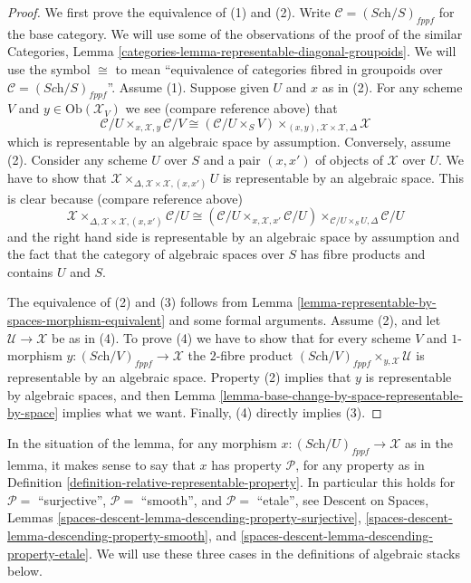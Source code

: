 \begin{proof}
We first prove the equivalence of (1) and (2).
Write $\mathcal{C} = (\textit{Sch}/S)_{fppf}$ for the base category.
We will use some of the observations of the proof of the similar
Categories, Lemma \ref{categories-lemma-representable-diagonal-groupoids}.
We will use the symbol $\cong$ to mean ``equivalence of categories fibred
in groupoids over $\mathcal{C} = (\textit{Sch}/S)_{fppf}$''.
Assume (1). Suppose given $U$ and $x$ as in (2). For any scheme $V$
and $y \in \text{Ob}(\mathcal{X}_V)$ we see (compare reference above) that
$$
\mathcal{C}/U
\times_{x, \mathcal{X}, y}
\mathcal{C}/V
\cong
(\mathcal{C}/U\times_S V)
\times_{(x, y), \mathcal{X} \times \mathcal{X}, \Delta}
\mathcal{X}
$$
which is representable by an algebraic space by assumption. Conversely,
assume (2). Consider any scheme $U$ over $S$ and a pair $(x, x')$
of objects of $\mathcal{X}$ over $U$. We have to show that
$\mathcal{X} \times_{\Delta, \mathcal{X} \times \mathcal{X}, (x, x')} U$
is representable by an algebraic space. This is clear because
(compare reference above)
$$
\mathcal{X}
\times_{\Delta, \mathcal{X} \times \mathcal{X}, (x, x')}
\mathcal{C}/U
\cong
(\mathcal{C}/U \times_{x, \mathcal{X}, x'} \mathcal{C}/U)
\times_{\mathcal{C}/U \times_S U, \Delta}
\mathcal{C}/U
$$
and the right hand side is representable by an algebraic space by assumption
and the fact that the category of algebraic spaces over $S$ has fibre products
and contains $U$ and $S$.

\medskip\noindent
The equivalence of (2) and (3) follows from
Lemma \ref{lemma-representable-by-spaces-morphism-equivalent}
and some formal arguments.
Assume (2), and let $\mathcal{U} \to \mathcal{X}$ be as in (4).
To prove (4) we have to show that for every scheme $V$ and $1$-morphism
$y : (\textit{Sch}/V)_{fppf} \to \mathcal{X}$ the $2$-fibre product
$(\textit{Sch}/V)_{fppf} \times_{y, \mathcal{X}} \mathcal{U}$
is representable by an algebraic space. Property (2) implies
that $y$ is representable by algebraic spaces, and then
Lemma \ref{lemma-base-change-by-space-representable-by-space}
implies what we want. Finally, (4) directly implies (3).
\end{proof}

\noindent
In the situation of the lemma, for any morphism
$x : (\textit{Sch}/U)_{fppf} \to \mathcal{X}$ as in the lemma, it makes sense
to say that $x$ has property $\mathcal{P}$, for any property
as in Definition \ref{definition-relative-representable-property}.
In particular this holds for
$\mathcal{P} = $ ``surjective'',
$\mathcal{P} = $ ``smooth'', and
$\mathcal{P} = $ ``etale'',
see
Descent on Spaces,
Lemmas \ref{spaces-descent-lemma-descending-property-surjective},
\ref{spaces-descent-lemma-descending-property-smooth}, and
\ref{spaces-descent-lemma-descending-property-etale}.
We will use these three cases in the definitions
of algebraic stacks below. 










